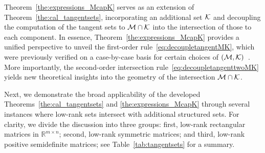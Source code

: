 Theorem~\ref{the:expressions_McapK} serves as an extension of Theorem~\ref{the:cal_tangentsets}, incorporating an additional set $\mathcal{K}$ and decoupling the computation of the tangent sets to $\mathcal{M}\cap\mathcal{K}$ into the intersection of those to each component. In essence, Theorem~\ref{the:expressions_McapK} provides a unified perspective to unveil the first-order rule~\eqref{eq:decoupletangentMK}, which were previously verified on a case-by-case basis for certain choices of $(\mathcal{M},\mathcal{K})$~\cite{cason2013iterative,li2023normalboundedaffine,yang2025spacedecouple,peng2025normalizedTT}. More importantly, the second-order intersection rule~\eqref{eq:decoupletangenttwoMK} yields new theoretical insights into the geometry of the intersection $\mathcal{M}\cap\mathcal{K}$.

Next, we demonstrate the broad applicability of the developed Theorems~\ref{the:cal_tangentsets} and \ref{the:expressions_McapK} through several instances where low-rank sets intersect with additional structured sets. For clarity, we divide the discussion into three groups: first, low-rank rectangular matrices in $\mathbb{R}^{m\times n}$; second, low-rank symmetric matrices; and third, low-rank positive semidefinite matrices; see Table~\ref{tab:tangentsets} for a summary.


